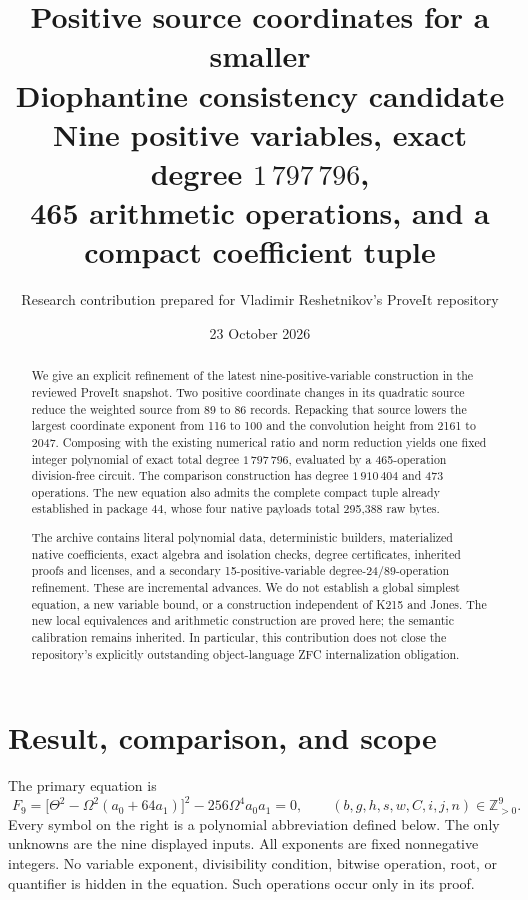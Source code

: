 \documentclass[11pt,a4paper]{article}
\title{\vspace{-8mm}\textbf{Positive source coordinates for a smaller\\
Diophantine consistency candidate}\\[4pt]
\large Nine positive variables, exact degree \(1\,797\,796\),\\
465 arithmetic operations, and a compact coefficient tuple}
\author{Research contribution prepared for Vladimir Reshetnikov's ProveIt repository}
\date{23 October 2026}
\theoremstyle{remark}
\newcommand{\PP}{\mathbb Z_{>0}}
\begin{document}
\maketitle
\begin{abstract}
We give an explicit refinement of the latest nine-positive-variable
construction in the reviewed ProveIt snapshot. Two positive coordinate
changes in its quadratic source reduce the weighted source from 89 to
86 records. Repacking that source lowers the largest coordinate exponent
from 116 to 100 and the convolution height from 2161 to 2047. Composing
with the existing numerical ratio and norm reduction yields one fixed
integer polynomial of exact total degree \(1\,797\,796\), evaluated by a
465-operation division-free circuit. The comparison construction has
degree \(1\,910\,404\) and 473 operations. The new equation also admits
the complete compact tuple already established in package 44, whose
four native payloads total 295,388 raw bytes.

The archive contains literal polynomial data, deterministic builders,
materialized native coefficients, exact algebra and isolation checks,
degree certificates, inherited proofs and licenses, and a secondary
15-positive-variable degree-24/89-operation refinement.
These are incremental advances. We do not establish a global simplest
equation, a new variable bound, or a construction independent of K215
and Jones. The new local equivalences and arithmetic construction are
proved here; the semantic calibration remains inherited. In particular,
this contribution does not close the repository's explicitly outstanding
object-language ZFC internalization obligation.
\end{abstract}

\section{Result, comparison, and scope}
\label{sec:scope}

The primary equation is
\begin{equation}
\boxed{\;
 F_9=\bigl[\Theta^2-\Omega^2(a_0+64a_1)\bigr]^2
       -256\Omega^4a_0a_1=0,\qquad
 (b,g,h,s,w,C,i,j,n)\in\PP^9 .
\;}
\label{eq:main}
\end{equation}
Every symbol on the right is a polynomial abbreviation defined below.
The only unknowns are the nine displayed inputs. All exponents are
fixed nonnegative integers. No variable exponent, divisibility
condition, bitwise operation, root, or quantifier is hidden in the
equation. Such operations occur only in its proof.
\end{document}
